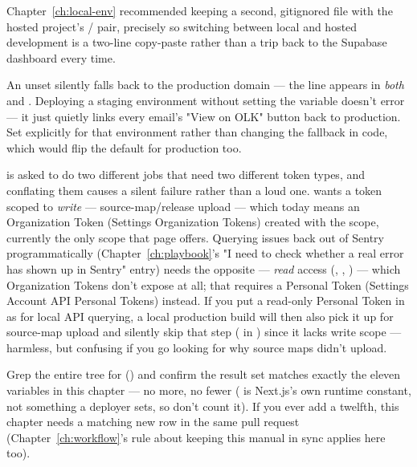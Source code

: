 \begin{olktip}
Chapter~\ref{ch:local-env} recommended keeping a second, gitignored  file with the hosted project's / pair, precisely so switching  between local and hosted development is a two-line copy-paste rather than a trip back to the Supabase dashboard every time.
\end{olktip}

\begin{olkhowto}
An unset  silently falls back to the production domain — the line  appears in \emph{both}  and . Deploying a staging environment without setting the variable doesn't error — it just quietly links every email's "View on OLK" button back to production. Set  explicitly for that environment rather than changing the fallback in code, which would flip the default for production too.
\end{olkhowto}

\begin{olknote}
 is asked to do two different jobs that need two different token types, and conflating them causes a silent failure rather than a loud one.  wants a token scoped to \emph{write} — source-map/release upload — which today means an Organization Token (Settings \textrightarrow{} Organization Tokens) created with the  scope, currently the only scope that page offers. Querying issues back out of Sentry programmatically (Chapter~\ref{ch:playbook}'s "I need to check whether a real error has shown up in Sentry" entry) needs the opposite — \emph{read} access (, , ) — which Organization Tokens don't expose at all; that requires a Personal Token (Settings \textrightarrow{} Account \textrightarrow{} API \textrightarrow{} Personal Tokens) instead. If you put a read-only Personal Token in  as  for local API querying, a local production build will then also pick it up for source-map upload and silently skip that step ( in ) since it lacks write scope — harmless, but confusing if you go looking for why source maps didn't upload.
\end{olknote}

\begin{olktask}
Grep the entire  tree for  () and confirm the result set matches exactly the eleven variables in this chapter — no more, no fewer ( is Next.js's own runtime constant, not something a deployer sets, so don't count it). If you ever add a twelfth, this chapter needs a matching new row in the same pull request (Chapter~\ref{ch:workflow}'s rule about keeping this manual in sync applies here too).
\end{olktask}
